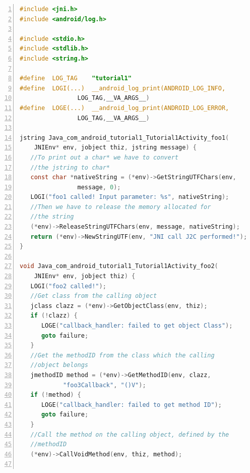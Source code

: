 \documentclass[a4paper,10pt]{article}
\begin{document}
\begin{multicols}{2}
\begin{lstlisting}[language=C,
				   columns=fullflexible,
				   showstringspaces=false,
				   xleftmargin=15pt,
				   frame = l,
				   numbers=left,
				   commentstyle=\color{gray}\upshape,
				   caption=tutorial1.c,
				   label=lst:tut1-c1]
#include <jni.h>
#include <android/log.h>

#include <stdio.h>
#include <stdlib.h>
#include <string.h>

#define  LOG_TAG    "tutorial1"
#define  LOGI(...)  __android_log_print(ANDROID_LOG_INFO,
				LOG_TAG,__VA_ARGS__)
#define  LOGE(...)  __android_log_print(ANDROID_LOG_ERROR,
				LOG_TAG,__VA_ARGS__)

jstring Java_com_android_tutorial1_Tutorial1Activity_foo1(
	JNIEnv* env, jobject thiz, jstring message) {
   //To print out a char* we have to convert
   //the jstring to char*
   const char *nativeString = (*env)->GetStringUTFChars(env,
				message, 0);
   LOGI("foo1 called! Input parameter: %s", nativeString);
   //Then we have to release the memory allocated for
   //the string
   (*env)->ReleaseStringUTFChars(env, message, nativeString);
   return (*env)->NewStringUTF(env, "JNI call J2C performed!");
}

void Java_com_android_tutorial1_Tutorial1Activity_foo2(
	JNIEnv* env, jobject thiz) {
   LOGI("foo2 called!");
   //Get class from the calling object
   jclass clazz = (*env)->GetObjectClass(env, thiz);
   if (!clazz) {
      LOGE("callback_handler: failed to get object Class");
      goto failure;
   }
   //Get the methodID from the class which the calling
   //object belongs
   jmethodID method = (*env)->GetMethodID(env, clazz,
   			"foo3Callback", "()V");
   if (!method) {
      LOGE("callback_handler: failed to get method ID");
      goto failure;
   }
   //Call the method on the calling object, defined by the
   //methodID
   (*env)->CallVoidMethod(env, thiz, method);


\end{lstlisting}
\end{multicols}
\end{document}
